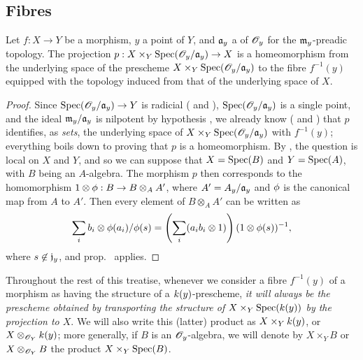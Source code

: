 \subsection{Fibres}
\label{subsection-fibres}

\begin{prop}[3.6.1]
\label{1.3.6.1}
Let $f:X\to Y$ be a morphism, $y$ a point of $Y$, and $\mathfrak{a}_y$ a  of $\mathscr{O}_y$ for the $\mathfrak{m}_y$-preadic topology.
The projection $p:X\times_Y\Spec(\OO_y/\fk{a}_y)\to X$ is a homeomorphism from the underlying space of the prescheme $X\times_Y{\mathop{\mathrm{Spec}}\nolimits}(\mathscr{O}_y/\mathfrak{a}_y)$ to the fibre $f^{-1}(y)$ equipped with the topology induced from that of the underlying space of $X$.
\end{prop}

\begin{proof}
\label{proof-1.3.6.1}
Since $\Spec(\OO_y/\fk{a}_y)\to Y$ is radicial ( and ), ${\mathop{\mathrm{Spec}}\nolimits}(\mathscr{O}_y/\mathfrak{a}_y)$ is a single point, and the ideal $\mathfrak{m}_y/\mathfrak{a}_y$ is nilpotent by hypothesis , we already know ( and ) that $p$ identifies, as \emph{sets}, the underlying space of $X\times_Y{\mathop{\mathrm{Spec}}\nolimits}(\mathscr{O}_y/\mathfrak{a}_y)$ with $f^{-1}(y)$; everything boils down to proving that $p$ is a homeomorphism.
By , the question is local on $X$ and $Y$, and so we can suppose that $X={\mathop{\mathrm{Spec}}\nolimits}(B)$ and $Y={\mathop{\mathrm{Spec}}\nolimits}(A)$, with $B$ being an $A$-algebra.
The morphism $p$ then corresponds to the homomorphism $1\otimes\vphi:B\to B\otimes_A A'$, where $A'=A_y/\mathfrak{a}_y$ and $\phi$ is the canonical map from $A$ to $A'$.
Then every element of $B\otimes_A A'$ can be written as
\[
  \sum_i b_i\otimes\phi(a_i)/\phi(s)=\left(\sum_i(a_ib_i\otimes1)\right)(1\otimes\phi(s))^{-1},
\]
where $s\not\in\mathfrak{j}_y$, and prop.~ applies.
\end{proof}

\begin{env}[3.6.2]
\label{1.3.6.2}
Throughout the rest of this treatise, whenever we consider a fibre $f^{-1}(y)$ of a morphism as having the structure of a $k(y)$-prescheme, \emph{it will always be the prescheme obtained by transporting the structure of $X\times_Y{\mathop{\mathrm{Spec}}\nolimits}(k(y))$ by the projection to $X$}.
We will also write this (latter) product as $X\times_Yk(y)$, or $X\otimes_{\mathscr{O}_Y}k(y)$; more generally, if $B$ is an $\mathscr{O}_y$-algebra, we will denote by $X\times_Y B$ or $X\otimes_{\mathscr{O}_Y}B$ the product $X\times_Y{\mathop{\mathrm{Spec}}\nolimits}(B)$.
\end{env}


